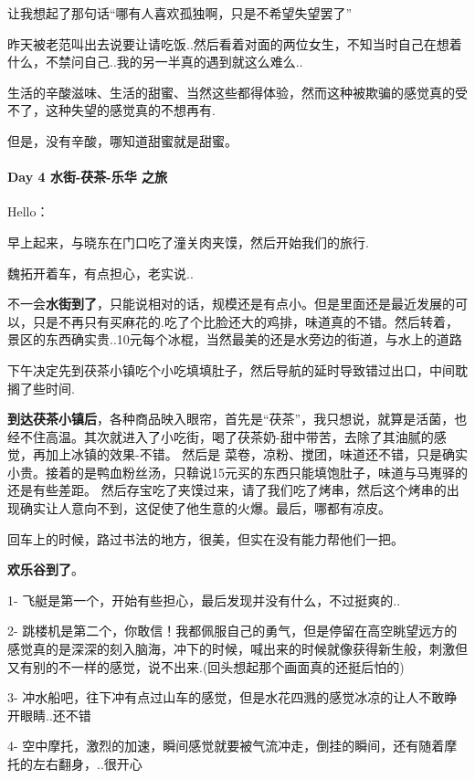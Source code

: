 \documentclass[UTF8,a4paper,8pt]{ctexbook}
\begin{document}
	 	 让我想起了那句话“哪有人喜欢孤独啊，只是不希望失望罢了”
	 	 
	 	 昨天被老范叫出去说要让请吃饭..然后看着对面的两位女生，不知当时自己在想着什么，不禁问自己..我的另一半真的遇到就这么难么..
	 	 
	 	 生活的辛酸滋味、生活的甜蜜、当然这些都得体验，然而这种被欺骗的感觉真的受不了，这种失望的感觉真的不想再有.
	 	 
	 	 但是，没有辛酸，哪知道甜蜜就是甜蜜。
 	 \paragraph{Day 4   水街-茯茶-乐华 之旅    \quad     }Hello：
 	 
	 	 早上起来，与晓东在门口吃了潼关肉夹馍，然后开始我们的旅行.
	 	 
	 	 魏拓开着车，有点担心，老实说..
	 	 
	 	 不一会\textbf{水街到了}，只能说相对的话，规模还是有点小。但是里面还是最近发展的可以，只是不再只有买麻花的.吃了个比脸还大的鸡排，味道真的不错。然后转着，景区的东西确实贵..10元每个冰棍，当然最美的还是水旁边的街道，与水上的道路
	 	 
	 	 下午决定先到茯茶小镇吃个小吃填填肚子，然后导航的延时导致错过出口，中间耽搁了些时间.
	 	 
	 	 \textbf{到达茯茶小镇后}，各种商品映入眼帘，首先是“茯茶”，我只想说，就算是活菌，也经不住高温。其次就进入了小吃街，喝了茯茶奶-甜中带苦，去除了其油腻的感觉，再加上冰镇的效果-不错。 然后是 菜卷，凉粉、搅团，味道还不错，只是确实小贵。接着的是鸭血粉丝汤，只鞥说15元买的东西只能填饱肚子，味道与马嵬驿的还是有些差距。 然后存宝吃了夹馍过来，请了我们吃了烤串，然后这个烤串的出现确实让人意向不到，这促使了他生意的火爆。最后，哪都有凉皮。
	 	 
	 	 回车上的时候，路过书法的地方，很美，但实在没有能力帮他们一把。
	 	 
	 	 \textbf{欢乐谷到了}。
	 	 
	 	 1- 飞艇是第一个，开始有些担心，最后发现并没有什么，不过挺爽的..
	 	 
	 	 2- 跳楼机是第二个，你敢信！我都佩服自己的勇气，但是停留在高空眺望远方的感觉真的是深深的刻入脑海，冲下的时候，喊出来的时候就像获得新生般，刺激但又有别的不一样的感觉，说不出来.(回头想起那个画面真的还挺后怕的)
	 	 
	 	 3- 冲水船吧，往下冲有点过山车的感觉，但是水花四溅的感觉冰凉的让人不敢睁开眼睛..还不错
	 	 
	 	 4- 空中摩托，激烈的加速，瞬间感觉就要被气流冲走，倒挂的瞬间，还有随着摩托的左右翻身，..很开心
	 	 
\end{document}
